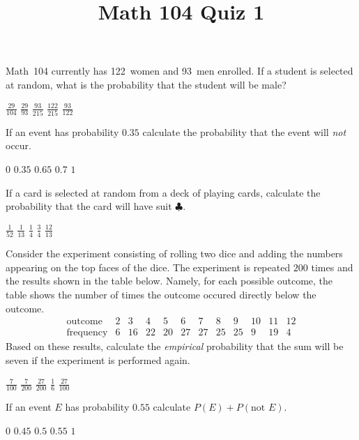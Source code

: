 \documentclass[12pt]{exam}
\title{Math 104 Quiz 1}
\begin{document}
\maketitle
\begin{center}
\end{center}

\begin{questions}
\question Math~104 currently has 122~women and 93~men enrolled.
If a student is selected at random, what is the probability
that the student will be male?
\begin{choices}
\choice $\frac{29}{104}$
\choice $\frac{29}{93}$
\choice $\frac{93}{215}$
\choice $\frac{122}{215}$
\choice $\frac{93}{122}$
\end{choices}

\question If an event has probability $0.35$
calculate the probability that the event will {\em not} occur.
\begin{choices}
\choice $0$
\choice $0.35$
\choice $0.65$
\choice $0.7$
\choice $1$
\end{choices}

\question If a card is selected at random from a deck of
playing cards, calculate the probability that
the card will have suit $\clubsuit$.
\begin{choices}
\choice $\frac{1}{52}$
\choice $\frac{1}{13}$
\choice $\frac{1}{4}$
\choice $\frac{3}{4}$
\choice $\frac{12}{13}$
\end{choices}

\question Consider the experiment consisting
of rolling two dice and adding the numbers
appearing on the top faces of the dice.
The experiment is repeated $200$ times and the
results shown in the table below. Namely, 
for each possible outcome, the table shows the number
of times the outcome occured directly below the outcome.
\[\begin{array}{r|ccccccccccc}
\text{outcome}&2&3&4&5&6&7&8&9&10&11&12\\\hline
\text{frequency}&6&16&22&20&27&27&25&25&9&19&4
\end{array}\]
Based on these results, calculate the {\em empirical} probability
that the sum will be seven if the experiment is performed again.
\begin{choices}
\choice $\frac{7}{100}$
\choice $\frac{7}{200}$
\choice $\frac{27}{200}$
\choice $\frac{1}{6}$
\choice $\frac{27}{100}$
\end{choices}

\question If an event $E$ has probability $0.55$
calculate $P\left(E\right)+P\left(\text{not $E$}\right)$.
\begin{choices}
\choice $0$
\choice $0.45$
\choice $0.5$
\choice $0.55$
\choice $1$
\end{choices}

\end{questions}
\end{document}
